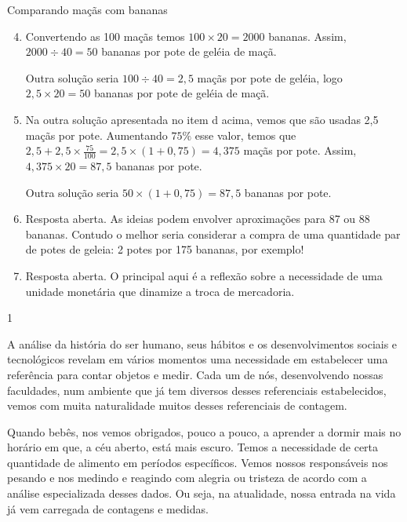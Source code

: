 \clearmargin
\begin{answer}{Comparando maçãs com bananas}
{
\begin{enumerate}\setcounter{enumi}{3}
\item Convertendo as 100 maçãs temos \(100 \times 20 = 2000\) bananas. Assim, \(2000 \div 40 = 50\) bananas por pote de geléia de maçã.

Outra solução seria \(100 \div 40 = 2,5\) maçãs por pote de geléia, logo \(2,5 \times 20 = 50\) bananas por pote de geléia de maçã.

\item {} 
Na outra solução apresentada no item d acima, vemos que são usadas 2,5 maçãs por pote. Aumentando $75\%$ esse valor, temos que \(2,5 + 2,5 \times \frac{75}{100} = 2,5 \times (1+0,75) = 4,375\) maçãs por pote. Assim, \(4,375\times 20 = 87,5\) bananas por pote.

Outra solução seria \(50 \times (1+0,75) = 87,5\) bananas por pote.

\item {} 
Resposta aberta. As ideias podem envolver aproximações para 87 ou 88 bananas. Contudo o melhor seria considerar a compra de uma quantidade par de potes de geleia: 2 potes por 175 bananas, por exemplo!

\item {} 
Resposta aberta. O principal aqui é a reflexão sobre a necessidade de uma unidade monetária que dinamize a troca de mercadoria.
\end{enumerate}
}{1}
\end{answer}

\label{\detokenize{NO103-0:explorando-qual-e-a-medida}}\label{\detokenize{NO103-0::doc}}


A análise da história do ser humano, seus hábitos e os desenvolvimentos sociais e tecnológicos revelam em vários momentos uma necessidade em estabelecer uma referência para contar objetos e medir. Cada um de nós, desenvolvendo nossas faculdades, num ambiente que já tem diversos desses referenciais estabelecidos, vemos com muita naturalidade muitos desses referenciais de contagem.

Quando bebês, nos vemos obrigados, pouco a pouco, a aprender a dormir mais no horário em que, a céu aberto, está mais escuro. Temos a necessidade de certa quantidade de alimento em períodos específicos. Vemos nossos responsáveis nos pesando e nos medindo e reagindo com alegria ou tristeza de acordo com a análise especializada desses dados. Ou seja, na atualidade, nossa entrada na vida já vem carregada de contagens e medidas.

